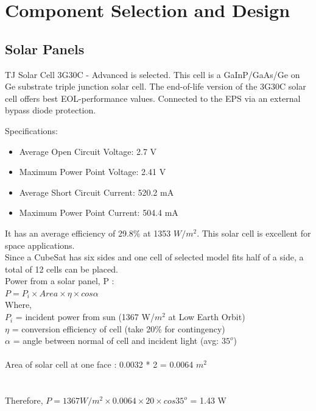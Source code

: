 \chapter{Component Selection and Design}
\justifying
\section[Solar Panels]{Solar Panels}
 TJ Solar Cell 3G30C - Advanced is selected. This cell is a GaInP/GaAs/Ge on Ge substrate triple junction solar cell. The end-of-life version of the 3G30C solar cell offers best EOL-performance
 values. Connected to the EPS via an external bypass diode protection.
 
 Specifications:
 \begin{itemize}
 	\item Average Open Circuit Voltage: 2.7 V
 	\item Maximum Power Point Voltage: 2.41 V
 	\item Average Short Circuit Current: 520.2 mA
 	\item Maximum Power Point Current: 504.4 mA
 \end{itemize}
It has an average efficiency of 29.8\% at 1353 $W/m^{2}$. This solar cell is excellent for space applications. 
\\

Since a CubeSat has six sides and one cell of selected model fits half of a side, a total of 12 cells can be placed.\\ 

Power from a solar panel, P :\\
\hspace*{2cm} $P = P_{i} \times Area \times \eta  \times cos \alpha $ 
\\
 Where, \\
 $P_{i}$ = incident power from sun (1367 W/$m^2$ at Low Earth Orbit)
\\  $\eta$ = conversion efficiency of cell (take 20\% for contingency)
\\  $\alpha$ = angle between normal of cell and incident light (avg: $35^{o} $)\\ \\
Area of solar cell at one face : 0.0032 * 2 = 0.0064 $m^2$\\
\\ \\ Therefore, $P = 1367 W/m^2 \times 0.0064 \times 20  \times cos 35^{o} $ = 1.43 W\\

